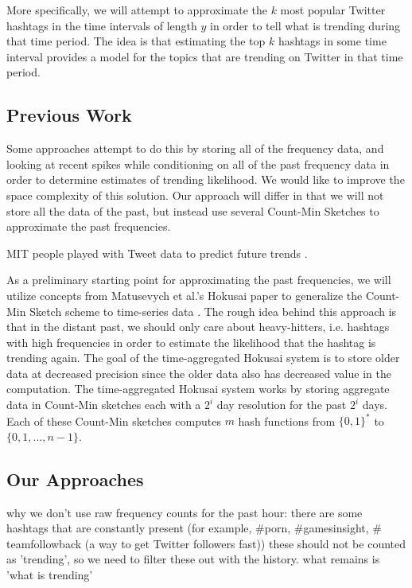 \documentclass[twoside]{article}
\newcommand{\cc}[1]
 {\textbf{\cite{#1}}}
\begin{document}
More specifically, we will attempt to approximate the $k$ most popular Twitter hashtags in the time intervals of length $y$ in order to tell what is trending during that time period.
The idea is that estimating the top $k$ hashtags in some time interval provides a model for the topics that are trending on Twitter in that time period.


\subsection{Previous Work} \label{sec:PreviousWork}


Some approaches attempt to do this by storing all of the frequency data, and looking at recent spikes while conditioning on all of the past frequency data in order to determine estimates of trending likelihood. We would like to improve the space complexity of this solution. Our approach will differ in that we will not store all the data of the past, but instead use several Count-Min Sketches to approximate the past frequencies. 

MIT people played with Tweet data to predict future trends \cc{MITNews2012}. 

As a preliminary starting point for approximating the past frequencies, we will utilize concepts from Matusevych et al.'s Hokusai paper to generalize the Count-Min Sketch scheme to time-series data \cc{Matusevych:2012}. The rough idea behind this approach is that in the distant past, we should only care about heavy-hitters, i.e. hashtags with high frequencies in order to estimate the likelihood that the hashtag is trending again.
The goal of the time-aggregated Hokusai system is to store older data at decreased precision since the older data also has decreased value in the computation.  The time-aggregated Hokusai system works by storing aggregate data in Count-Min sketches each with a $2^i$ day resolution for the past $2^i$ days.  Each of these Count-Min sketches computes $m$ hash functions from $\{0,1\}^*$ to $\{0, 1, ..., n-1\}$.


\subsection{Our Approaches}

why we don't use raw frequency counts for the past hour:
there are some hashtags that are constantly present (for example, $\#$porn, $\#$gamesinsight, $\#$teamfollowback (a way to get Twitter followers fast))
these should not be counted as 'trending', so we need to filter these out
with the history. what remains is 'what is trending'
\end{document}
